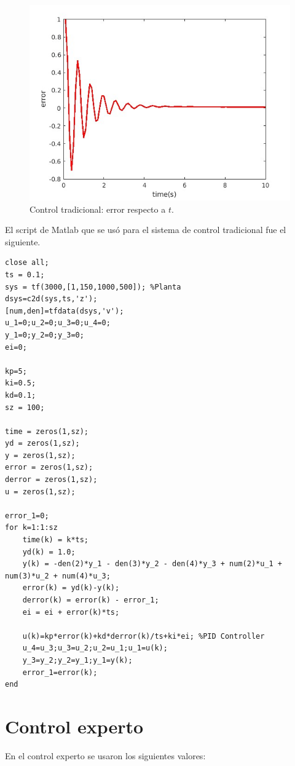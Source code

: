 \documentclass{article}
\begin{document}
\begin{figure}
\center
\includegraphics[scale=0.5]{trad_error.jpg}
\caption{Control tradicional: error respecto a $t$.}
\label{tradicional_error}
\end{figure}

El script de Matlab que se usó para el sistema de control tradicional fue el siguiente.

\begin{verbatim}
close all;
ts = 0.1;
sys = tf(3000,[1,150,1000,500]); %Planta
dsys=c2d(sys,ts,'z');
[num,den]=tfdata(dsys,'v');
u_1=0;u_2=0;u_3=0;u_4=0;
y_1=0;y_2=0;y_3=0;
ei=0;

kp=5;
ki=0.5;
kd=0.1;
sz = 100;

time = zeros(1,sz);
yd = zeros(1,sz);
y = zeros(1,sz);
error = zeros(1,sz);
derror = zeros(1,sz);
u = zeros(1,sz);

error_1=0;
for k=1:1:sz
    time(k) = k*ts;
    yd(k) = 1.0;
    y(k) = -den(2)*y_1 - den(3)*y_2 - den(4)*y_3 + num(2)*u_1 + num(3)*u_2 + num(4)*u_3;
    error(k) = yd(k)-y(k);
    derror(k) = error(k) - error_1;
    ei = ei + error(k)*ts;

    u(k)=kp*error(k)+kd*derror(k)/ts+ki*ei; %PID Controller
    u_4=u_3;u_3=u_2;u_2=u_1;u_1=u(k);
    y_3=y_2;y_2=y_1;y_1=y(k);
    error_1=error(k);
end
\end{verbatim}

\section{Control experto}

En el control experto se usaron los siguientes valores:
\end{document}
